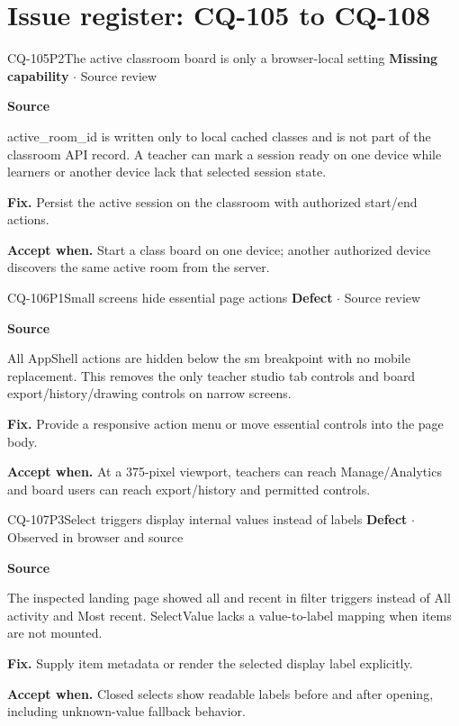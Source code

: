 \section*{Issue register: CQ-105 to CQ-108}
\begin{finding}{CQ-105}{P2}{The active classroom board is only a browser-local setting}
\textbf{Missing capability} $\cdot$ Source review\par
\textbf{Source}\quad{}\par
active\_room\_id is written only to local cached classes and is not part of the classroom API record. A teacher can mark a session ready on one device while learners or another device lack that selected session state.\par
\textbf{Fix.} Persist the active session on the classroom with authorized start/end actions.\par
\textbf{Accept when.} Start a class board on one device; another authorized device discovers the same active room from the server.
\end{finding}
\begin{finding}{CQ-106}{P1}{Small screens hide essential page actions}
\textbf{Defect} $\cdot$ Source review\par
\textbf{Source}\quad{}\par
All AppShell actions are hidden below the sm breakpoint with no mobile replacement. This removes the only teacher studio tab controls and board export/history/drawing controls on narrow screens.\par
\textbf{Fix.} Provide a responsive action menu or move essential controls into the page body.\par
\textbf{Accept when.} At a 375-pixel viewport, teachers can reach Manage/Analytics and board users can reach export/history and permitted controls.
\end{finding}
\begin{finding}{CQ-107}{P3}{Select triggers display internal values instead of labels}
\textbf{Defect} $\cdot$ Observed in browser and source\par
\textbf{Source}\quad{}\par
The inspected landing page showed all and recent in filter triggers instead of All activity and Most recent. SelectValue lacks a value-to-label mapping when items are not mounted.\par
\textbf{Fix.} Supply item metadata or render the selected display label explicitly.\par
\textbf{Accept when.} Closed selects show readable labels before and after opening, including unknown-value fallback behavior.
\end{finding}

